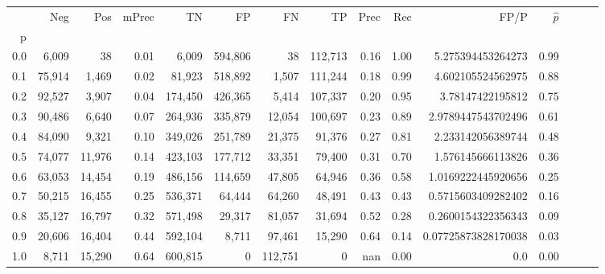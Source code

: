 \begin{tabular}{rrrrrrrrrrrrrrr}
\toprule
{} &     Neg &     Pos & mPrec &       TN &       FP &       FN &       TP &  Prec &   Rec &                 FP/P & $\hat{p}$ \\
p   &         &         &       &          &          &          &          &       &       &                      &           \\
\midrule
0.0 &   6,009 &      38 &  0.01 &    6,009 &  594,806 &       38 &  112,713 &  0.16 &  1.00 &    5.275394453264273 &      0.99 \\
0.1 &  75,914 &   1,469 &  0.02 &   81,923 &  518,892 &    1,507 &  111,244 &  0.18 &  0.99 &    4.602105524562975 &      0.88 \\
0.2 &  92,527 &   3,907 &  0.04 &  174,450 &  426,365 &    5,414 &  107,337 &  0.20 &  0.95 &     3.78147422195812 &      0.75 \\
0.3 &  90,486 &   6,640 &  0.07 &  264,936 &  335,879 &   12,054 &  100,697 &  0.23 &  0.89 &   2.9789447543702496 &      0.61 \\
0.4 &  84,090 &   9,321 &  0.10 &  349,026 &  251,789 &   21,375 &   91,376 &  0.27 &  0.81 &    2.233142056389744 &      0.48 \\
0.5 &  74,077 &  11,976 &  0.14 &  423,103 &  177,712 &   33,351 &   79,400 &  0.31 &  0.70 &    1.576145666113826 &      0.36 \\
0.6 &  63,053 &  14,454 &  0.19 &  486,156 &  114,659 &   47,805 &   64,946 &  0.36 &  0.58 &   1.0169222445920656 &      0.25 \\
0.7 &  50,215 &  16,455 &  0.25 &  536,371 &   64,444 &   64,260 &   48,491 &  0.43 &  0.43 &   0.5715603409282402 &      0.16 \\
0.8 &  35,127 &  16,797 &  0.32 &  571,498 &   29,317 &   81,057 &   31,694 &  0.52 &  0.28 &   0.2600154322356343 &      0.09 \\
0.9 &  20,606 &  16,404 &  0.44 &  592,104 &    8,711 &   97,461 &   15,290 &  0.64 &  0.14 &  0.07725873828170038 &      0.03 \\
1.0 &   8,711 &  15,290 &  0.64 &  600,815 &        0 &  112,751 &        0 &   nan &  0.00 &                  0.0 &      0.00 \\
\bottomrule
\end{tabular}
